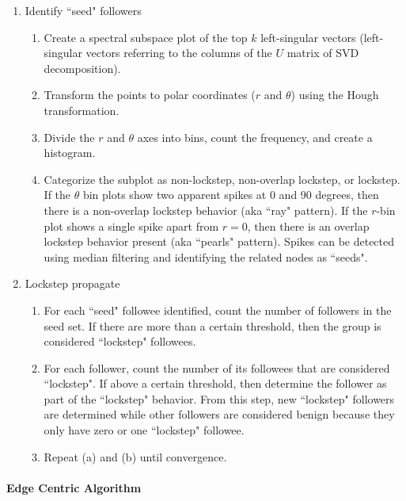 \documentclass[11pt, oneside]{article}   	%
\begin{document}
\begin{enumerate}
	\item Identify ``seed" followers
	\begin{enumerate}
		\item Create a spectral subspace plot of the top $k$ left-singular vectors (left-singular vectors referring to the columns of the $U$ matrix of SVD decomposition).
		\item Transform the points to polar coordinates ($r$ and $\theta$) using the Hough transformation.
		\item Divide the $r$ and $\theta$ axes into bins, count the frequency, and create a histogram.
		\item Categorize the subplot as non-lockstep, non-overlap lockstep, or lockstep.
		If the $\theta$ bin plots show two apparent spikes at 0 and 90 degrees, then there is a non-overlap lockstep behavior (aka ``ray" pattern).
		If the $r$-bin plot shows a single spike apart from $r = 0$, then there is an overlap lockstep behavior present (aka ``pearls" pattern).
		Spikes can be detected using median filtering and identifying the related nodes as ``seeds".
	\end{enumerate}
	\item Lockstep propagate
	\begin{enumerate}
		\item For each ``seed" followee identified, count the number of followers in the seed set.
		If there are more than a certain threshold, then the group is considered ``lockstep" followees.
		\item For each follower, count the number of its followees that are considered ``lockstep".
		If above a certain threshold, then determine the follower as part of the ``lockstep" behavior.
		From this step, new ``lockstep" followers are determined while other followers are considered benign because they only have zero or one ``lockstep" followee.
		\item Repeat (a) and (b) until convergence.
	\end{enumerate}
\end{enumerate}

\paragraph{Edge Centric Algorithm}
\quad
\end{document}
